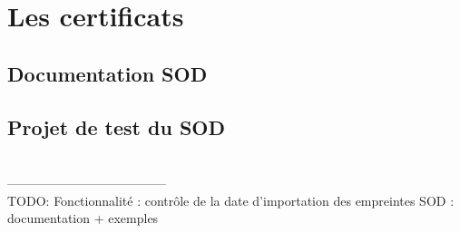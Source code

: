 \section{Les certificats}


\subsection{Documentation SOD}


\subsection{Projet de test du SOD}



~~\\--------------------------------------~~\\
TODO:
Fonctionnalité : contrôle de la date d'importation des empreintes
SOD : documentation + exemples